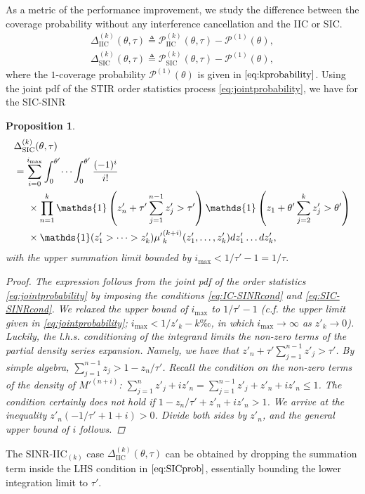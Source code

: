 \documentclass[lettersize,journal]{IEEEtran}
\newtheorem{prop}[theorem]{Proposition}
\begin{document}
 As a metric of the performance improvement, we study the difference between the coverage probability without any interference cancellation and the IIC or SIC. 
\begin{align}
  \Delta^{(k)}_{\text{IIC}}(\theta,\tau) \triangleq \mathcal{P}^{(k)}_{\text{IIC}}(\theta,\tau)- \mathcal{P}^{(1)}(\theta),\nonumber\\
  \Delta^{(k)}_{\text{SIC}}(\theta,\tau) \triangleq \mathcal{P}^{(k)}_{\text{SIC}}(\theta,\tau)- \mathcal{P}^{(1)}(\theta),
\end{align}
where the $1$-coverage probability  $\mathcal{P}^{(1)}(\theta)$ is given in $\eqref{eq:kprobability}$. Using the joint pdf of the STIR order statistics process \eqref{eq:jointprobability}, we have for the SIC-SINR
\begin{prop}
  \begin{align}
    \label{eq:SICprob}
    & \Delta^{(k)}_{\text{SIC}}(\theta,\tau) \nonumber\\
    &=\sum^{i_{\text{max}}}_{i=0} \int_{0}^{\theta'} \dots \int_{0}^{\theta'}\frac{(-1)^i}{i!}\nonumber \\
    & \hspace{0.5cm}\times \prod_{n=1}^k\mathds{1}\left( z'_n+ \tau'\sum_{j=1}^{n-1} z'_j>\tau' \right)  \mathds{1}\left(z_1+  \theta'\sum_{j=2}^k z'_j>\theta' \right) \nonumber \\
    &\hspace{0.5cm} \times \mathds{1}(z'_1>\dots>z'_k){\mu'}_k^{(k+i)}(z'_1,\dots,z'_k) d z'_1 \dots d z'_k,
  \end{align}
  with the upper summation limit bounded by $i_{\text{max}} < 1/\tau'-1=1/\tau.$ 
  \begin{proof}
    The expression follows from the joint pdf of the order statistics \eqref{eq:jointprobability} by imposing the conditions \eqref{eq:IC-SINRcond} and \eqref{eq:SIC-SINRcond}. We relaxed the upper bound of  $i_{\text{max}}$ to $1/\tau'-1$ (c.f. the upper limit given in \eqref{eq:jointprobability}; $i_{\text{max}} < 1/z'_{k}-k‰$, in which $i_{\text{max}} \rightarrow \infty$ as $z'_k \rightarrow 0$). Luckily, the l.h.s. conditioning of the integrand limits the non-zero terms of the partial density series expansion. Namely, we have that $z'_{n}+\tau'\sum_{j=1}^{n-1}z'_{j}>\tau'$. By simple algebra, $\sum_{j=1}^{n-1}z_{j}> 1-z_{n}/\tau'$. Recall the condition on the non-zero terms of the density of $M'^{(n+i)}$:  $\sum_{j=1}^n z'_{j}+i z'_{n} =\sum_{j=1}^{n-1}z'_{j} +z'_{n}+i z'_{n}  \leq 1$. The condition certainly \textit{does not} hold if $1-z_{n}/\tau'+ z'_{n}+i z'_{n}>1$. We arrive at the inequality $z'_{n} \left(-1/\tau' + 1 +i \right)>0$. Divide both sides by $z'_{n}$, and the general upper bound of $i$ follows.

    


  \end{proof}
\end{prop}
The SINR-IIC$_{(k)}$ case $\Delta^{(k)}_{\text{IIC}}(\theta,\tau)$ can be obtained by dropping the summation term inside the LHS condition in $\eqref{eq:SICprob}$, essentially bounding the lower integration limit to $\tau'$.
\end{document}
